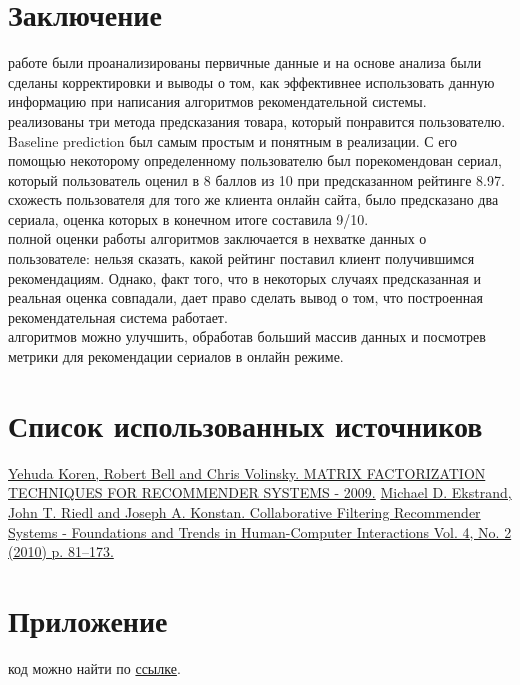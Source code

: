 \documentclass{article}
\newcommand\tab[1][1cm]{\hspace*{#1}}
\begin{document}
\section{Заключение}
 работе были проанализированы первичные данные и на основе анализа были сделаны корректировки и выводы о том, как эффективнее использовать данную информацию при написания алгоритмов рекомендательной системы. \\
 реализованы три метода предсказания товара, который понравится пользователю. Baseline prediction был самым простым и понятным в реализации. С его помощью некоторому определенному пользователю был порекомендован сериал, который пользователь оценил в 8 баллов из 10 при предсказанном рейтинге 8.97.\\
 схожесть пользователя для того же клиента онлайн сайта, было предсказано два сериала, оценка которых в конечном итоге составила 9/10.\\
 полной оценки работы алгоритмов заключается в нехватке данных о пользователе: нельзя сказать, какой рейтинг поставил клиент получившимся рекомендациям. Однако, факт того, что в некоторых случаях предсказанная и реальная оценка совпадали, дает право сделать вывод о том, что построенная рекомендательная система работает.\\
 алгоритмов можно улучшить, обработав больший массив данных и посмотрев метрики для рекомендации сериалов в онлайн режиме.
\newpage
\section{Список использованных источников}
\renewcommand{\refname}{}
\begin{thebibliography}{7}
 \href{https://datajobs.com/data-science-repo/Recommender-Systems-[Netflix].pdf}{Yehuda Koren, Robert Bell and Chris Volinsky. MATRIX FACTORIZATION TECHNIQUES FOR RECOMMENDER SYSTEMS - 2009.}
 \href{http://files.grouplens.org/papers/FnT\%20CF\%20Recsys\%20Survey.pdf}{Michael D. Ekstrand, John T. Riedl and Joseph A. Konstan. Collaborative Filtering Recommender Systems - Foundations and Trends in Human-Computer Interactions Vol. 4, No. 2 (2010) p. 81–173.}
\end{thebibliography}

\newpage
\section{Приложение}
 код можно найти по \href{https://github.com/dokapoka/paper_recomm_systems}{ссылке}.

 
\end{document}

